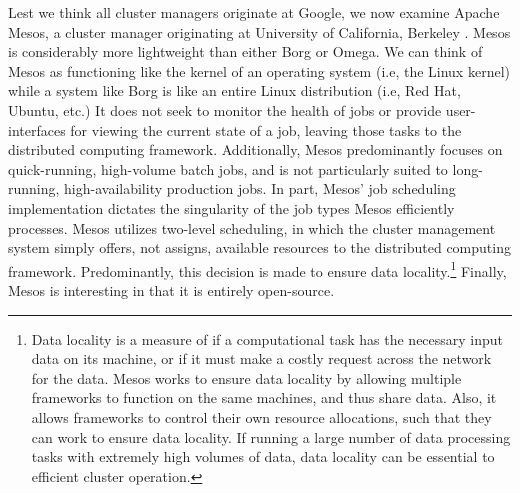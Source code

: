 Lest we think all cluster managers originate at Google, we now examine Apache
Mesos, a cluster manager originating at University of California, Berkeley
\cite{mesos}. Mesos is considerably more lightweight than either Borg or Omega.
We can think of Mesos as functioning like the kernel of an operating system
(i.e, the Linux kernel) while a system like Borg is like an entire Linux
distribution (i.e, Red Hat, Ubuntu, etc.)
It does not seek to monitor the health of jobs or provide user-interfaces for viewing the
current state of a job, leaving those tasks to the distributed computing
framework. Additionally, Mesos predominantly focuses on quick-running,
high-volume batch jobs, and is not particularly suited to long-running,
high-availability production jobs. In part, Mesos'
job scheduling implementation dictates the singularity of the job types
Mesos efficiently processes. Mesos utilizes two-level scheduling, in which the
cluster management system simply offers, not assigns, available
resources to the distributed computing framework. Predominantly, this decision
is made to ensure data locality.\footnote{Data locality is a measure
of if a computational task has the necessary input data on its machine, or if it must make a
costly request across the network for the data. Mesos works to ensure data
locality by allowing multiple frameworks to function on the same machines, and
thus share data. Also, it allows frameworks to control their own resource
allocations, such
that they can work to ensure data locality. If running a large number of data
processing tasks with extremely high volumes of data, data locality can be
essential to efficient cluster operation.} Finally, Mesos is interesting in
that it is entirely open-source.
